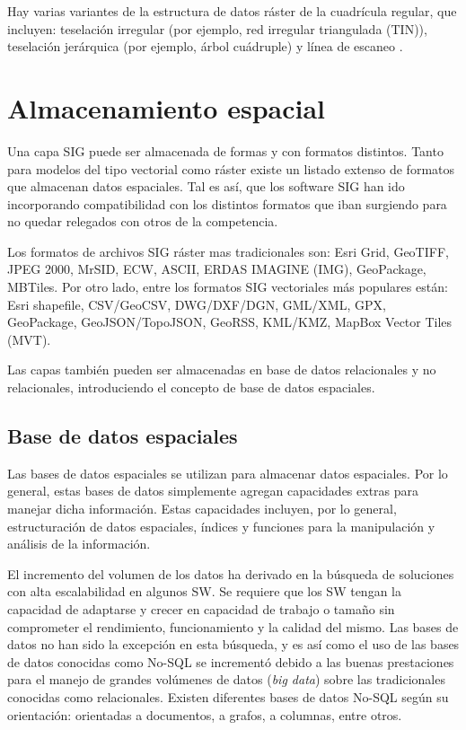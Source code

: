 Hay varias variantes de la estructura de datos ráster de la cuadrícula regular, que incluyen: teselación irregular (por ejemplo, red irregular triangulada (TIN)), teselación jerárquica (por ejemplo, árbol cuádruple) y línea de escaneo \citep{Peuquet1991MethodsEnvironment}.

\section{Almacenamiento espacial}

Una capa SIG puede ser almacenada de formas y con formatos distintos. Tanto para modelos del tipo vectorial como ráster existe un listado extenso de formatos que almacenan datos espaciales. Tal es así, que los software SIG han ido incorporando compatibilidad con los distintos formatos que iban surgiendo para no quedar relegados con otros de la competencia.

Los formatos de archivos SIG ráster mas tradicionales son: Esri Grid, GeoTIFF, JPEG 2000, MrSID, ECW, ASCII, ERDAS IMAGINE (IMG), GeoPackage, MBTiles. Por otro lado, entre los formatos SIG vectoriales más populares están: Esri shapefile, CSV/GeoCSV, DWG/DXF/DGN, GML/XML, GPX, GeoPackage, GeoJSON/TopoJSON, GeoRSS, KML/KMZ, MapBox Vector Tiles (MVT).

Las capas también pueden ser almacenadas en base de datos relacionales y no relacionales, introduciendo el concepto de base de datos espaciales.


\subsection{Base de datos espaciales}

Las bases de datos espaciales se utilizan para almacenar datos espaciales. Por lo general, estas bases de datos simplemente agregan capacidades extras para manejar dicha información. Estas capacidades incluyen, por lo general, estructuración de datos espaciales, índices y funciones para la manipulación y análisis de la información.

El incremento del volumen de los datos ha derivado en la búsqueda de soluciones con alta escalabilidad en algunos SW. Se requiere que los SW tengan la capacidad de adaptarse y crecer en capacidad de trabajo o tamaño sin comprometer el rendimiento, funcionamiento y la calidad del mismo. Las bases de datos no han sido la excepción en esta búsqueda, y es así como el uso de las bases de datos conocidas como No-SQL se incrementó debido a las buenas prestaciones para el manejo de grandes volúmenes de datos (\textit{big data}) sobre las tradicionales conocidas como relacionales. Existen diferentes bases de datos No-SQL según su orientación: orientadas a documentos, a grafos, a columnas, entre otros.

